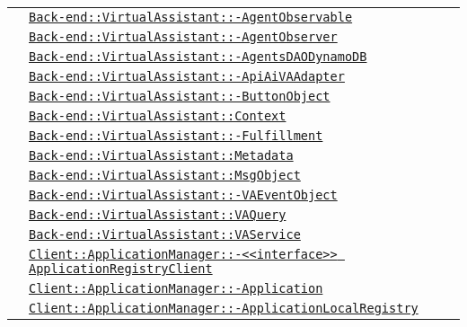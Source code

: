 \begin{longtable}{|>{\centering}m{3cm}|m{10cm}<{\centering}|}
& \hyperref[Back-end::VirtualAssistant::AgentObservable]{\texttt{Back-end::VirtualAssistant::-\linebreak AgentObservable}}\\
& \hyperref[Back-end::VirtualAssistant::AgentObserver]{\texttt{Back-end::VirtualAssistant::-\linebreak AgentObserver}}\\
& \hyperref[Back-end::VirtualAssistant::AgentsDAODynamoDB]{\texttt{Back-end::VirtualAssistant::-\linebreak AgentsDAODynamoDB}}\\
& \hyperref[Back-end::VirtualAssistant::ApiAiVAAdapter]{\texttt{Back-end::VirtualAssistant::-\linebreak ApiAiVAAdapter}}\\
& \hyperref[Back-end::VirtualAssistant::ButtonObject]{\texttt{Back-end::VirtualAssistant::-\linebreak ButtonObject}}\\
& \hyperref[Back-end::VirtualAssistant::Context]{\texttt{Back-end::VirtualAssistant::Context}}\\
& \hyperref[Back-end::VirtualAssistant::Fulfillment]{\texttt{Back-end::VirtualAssistant::-\linebreak Fulfillment}}\\
& \hyperref[Back-end::VirtualAssistant::Metadata]{\texttt{Back-end::VirtualAssistant::Metadata}}\\
& \hyperref[Back-end::VirtualAssistant::MsgObject]{\texttt{Back-end::VirtualAssistant::MsgObject}}\\
& \hyperref[Back-end::VirtualAssistant::VAEventObject]{\texttt{Back-end::VirtualAssistant::-\linebreak VAEventObject}}\\
& \hyperref[Back-end::VirtualAssistant::VAQuery]{\texttt{Back-end::VirtualAssistant::VAQuery}}\\
& \hyperref[Back-end::VirtualAssistant::VAService]{\texttt{Back-end::VirtualAssistant::VAService}}\\
& \hyperref[Client::ApplicationManager::<<interface>> ApplicationRegistryClient]{\texttt{Client::ApplicationManager::-\linebreak <<interface>> ApplicationRegistryClient}}\\
& \hyperref[Client::ApplicationManager::Application]{\texttt{Client::ApplicationManager::-\linebreak Application}}\\
& \hyperref[Client::ApplicationManager::ApplicationLocalRegistry]{\texttt{Client::ApplicationManager::-\linebreak ApplicationLocalRegistry}}\\

\end{longtable}
